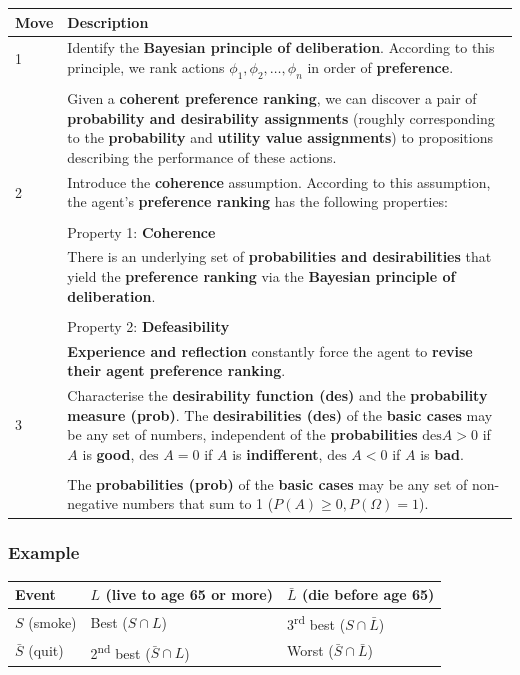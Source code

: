 \documentclass[11pt]{article}
\begin{document}
\begin{center}
\begin{tabular}{|m{2em}|m{28em}|}
\hline
Move & Description\\
\hline
1 & Identify the \textbf{Bayesian principle of deliberation}. According to this principle, we rank actions \(\phi_1, \phi_2, \ldots, \phi_n\) in order of \textbf{preference}.\\
 & \\
 & Given a \textbf{coherent preference ranking}, we can discover a pair of \textbf{probability and desirability assignments} (roughly corresponding to the \textbf{probability} and \textbf{utility value assignments}) to propositions describing the performance of these actions.\\
\hline
2 & Introduce the \textbf{coherence} assumption. According to this assumption, the agent's \textbf{preference ranking} has the following properties:\\
 & \\
 & Property 1: \textbf{Coherence}\\
 & There is an underlying set of \textbf{probabilities and desirabilities} that yield the \textbf{preference ranking} via the \textbf{Bayesian principle of deliberation}.\\
 & \\
 & Property 2: \textbf{Defeasibility}\\
 & \textbf{Experience and reflection} constantly force the agent to \textbf{revise their agent preference ranking}.\\
\hline
3 & Characterise the \textbf{desirability function (des)} and the \textbf{probability measure (prob)}. The \textbf{desirabilities (des)} of the \textbf{basic cases} may be any set of numbers, independent of the \textbf{probabilities} \(\text{des} A > 0\) if \(A\) is \textbf{good}, \(\text{des } A = 0\) if \(A\) is \textbf{indifferent}, \(\text{des } A < 0\) if \(A\) is \textbf{bad}.\\
 & \\
 & The \textbf{probabilities (prob)} of the \textbf{basic cases} may be any set of non-negative numbers that sum to 1 (\(P(A) \ge 0, P(\Omega) = 1\)).\\
\hline
\end{tabular}
\end{center}
\subsubsection{Example}
\label{sec:org6133cf2}
\begin{center}
\begin{tabular}{l|l|l}
Event & \(L\) (live to age 65 or more) & \(\bar{L}\) (die before age 65)\\
\hline
\(S\) (smoke) & Best (\(S \cap L\)) & 3\textsuperscript{rd} best (\(S \cap \bar{L}\))\\
\hline
\(\bar{S}\) (quit) & 2\textsuperscript{nd} best (\(\bar{S} \cap L\)) & Worst (\(\bar{S} \cap \bar{L}\))\\
\end{tabular}
\end{center}
\end{document}
